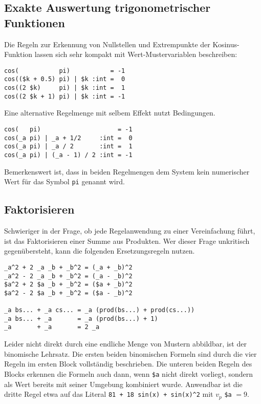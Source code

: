\subsection{Exakte Auswertung trigonometrischer Funktionen} \label{subsubsecCos}
Die Regeln zur Erkennung von Nullstellen und Extrempunkte der Kosinus-Funktion lassen sich sehr kompakt mit Wert-Mustervariablen beschreiben: 

\begin{unbreakable}\begin{verbatim}
cos(           pi)           = -1
cos(($k + 0.5) pi) | $k :int =  0
cos((2 $k)     pi) | $k :int =  1
cos((2 $k + 1) pi) | $k :int = -1
\end{verbatim}\end{unbreakable}

Eine alternative Regelmenge mit selbem Effekt nutzt Bedingungen.

\begin{unbreakable}\begin{verbatim}
cos(   pi)                     = -1
cos(_a pi) | _a + 1/2     :int =  0
cos(_a pi) | _a / 2       :int =  1
cos(_a pi) | (_a - 1) / 2 :int = -1
\end{verbatim}\end{unbreakable}

Bemerkenswert ist, dass in beiden Regelmengen dem System kein numerischer Wert für das Symbol \verb|pi| genannt wird.

\subsection{Faktorisieren}
Schwieriger in der Frage, ob jede Regelanwendung zu einer Vereinfachung führt, ist das Faktorisieren einer Summe aus Produkten. Wer dieser Frage unkritisch gegenübersteht, kann die folgenden Ersetzungsregeln nutzen.

\begin{unbreakable}\begin{verbatim}
_a^2 + 2 _a _b + _b^2 = (_a + _b)^2
_a^2 - 2 _a _b + _b^2 = (_a - _b)^2
$a^2 + 2 $a _b + _b^2 = ($a + _b)^2
$a^2 - 2 $a _b + _b^2 = ($a - _b)^2

_a bs... + _a cs... = _a (prod(bs...) + prod(cs...))
_a bs... + _a       = _a (prod(bs...) + 1)
_a       + _a       = 2 _a
\end{verbatim}\end{unbreakable}

Leider nicht direkt durch eine endliche Menge von Mustern abbildbar, ist der binomische Lehrsatz. Die ersten beiden binomischen Formeln sind durch die vier Regeln im ersten Block vollständig beschrieben. Die unteren beiden Regeln des Blocks erkennen die Formeln auch dann, wenn \verb|$a| nicht direkt vorliegt, sondern als Wert bereits mit seiner Umgebung kombiniert wurde. Anwendbar ist die dritte Regel etwa auf das Literal \verb|81 + 18 sin(x) + sin(x)^2| mit $v_p$ \verb|$a| $= 9$.

